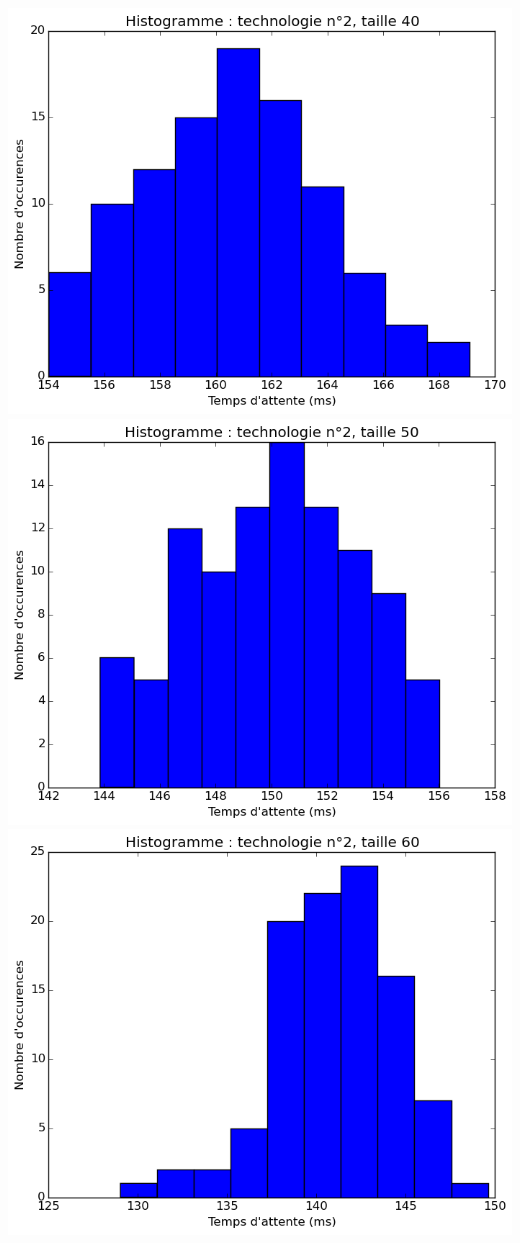 \documentclass[a4paper,10pt]{article}
\begin{document}
\includegraphics[scale=0.4]{img/2-40.png}
\\
\includegraphics[scale=0.4]{img/2-50.png}
\includegraphics[scale=0.4]{img/2-60.png}
\end{document}
